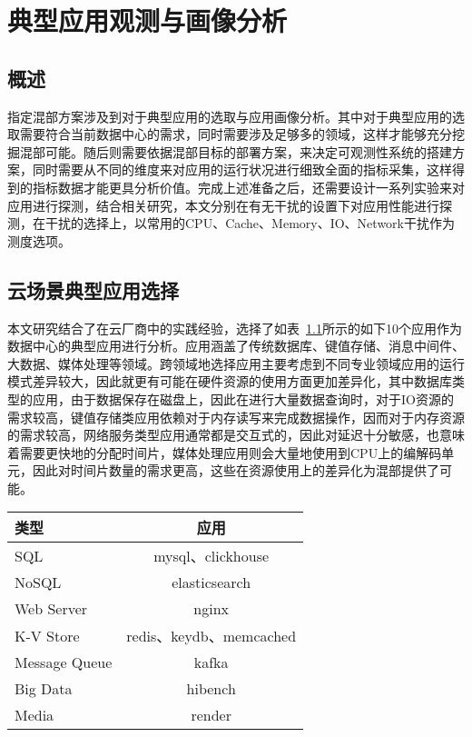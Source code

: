 \chapter{典型应用观测与画像分析}\label{chap:profiling}

\section{概述}


指定混部方案涉及到对于典型应用的选取与应用画像分析。其中对于典型应用的选取需要符合当前数据中心的需求，同时需要涉及足够多的领域，这样才能够充分挖掘混部可能。随后则需要依据混部目标的部署方案，来决定可观测性系统的搭建方案，同时需要从不同的维度来对应用的运行状况进行细致全面的指标采集，这样得到的指标数据才能更具分析价值。完成上述准备之后，还需要设计一系列实验来对应用进行探测，结合相关研究，本文分别在有无干扰的设置下对应用性能进行探测，在干扰的选择上，以常用的CPU、Cache、Memory、IO、Network干扰作为测度选项。

\section{云场景典型应用选择}


本文研究结合了在云厂商中的实践经验，选择了如表~\ref{tab:typical_application}所示的如下10个应用作为数据中心的典型应用进行分析。应用涵盖了传统数据库、键值存储、消息中间件、大数据、媒体处理等领域。跨领域地选择应用主要考虑到不同专业领域应用的运行模式差异较大，因此就更有可能在硬件资源的使用方面更加差异化，其中数据库类型的应用，由于数据保存在磁盘上，因此在进行大量数据查询时，对于IO资源的需求较高，键值存储类应用依赖对于内存读写来完成数据操作，因而对于内存资源的需求较高，网络服务类型应用通常都是交互式的，因此对延迟十分敏感，也意味着需要更快地的分配时间片，媒体处理应用则会大量地使用到CPU上的编解码单元，因此对时间片数量的需求更高，这些在资源使用上的差异化为混部提供了可能。

\begin{table}
    \label{tab:typical_application}
    \footnotesize%
    \setlength{\tabcolsep}{4pt}%
    \renewcommand{\arraystretch}{1.5}%
    \centering
    \begin{tabular}{lc}
        \hline
        类型 & 应用\\
        \hline
        SQL & mysql、clickhouse\\
        NoSQL & elasticsearch\\
        Web Server & nginx\\
        K-V Store & redis、keydb、memcached\\
        Message Queue & kafka\\
        Big Data & hibench\\
        Media & render\\
        \hline
    \end{tabular}
\end{table}

